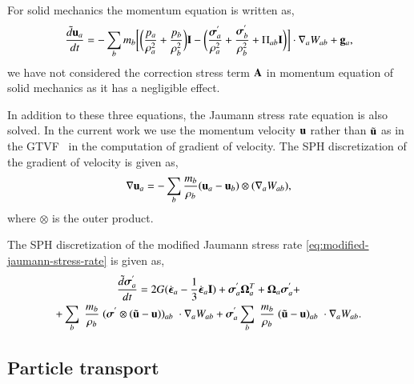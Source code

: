 %
For solid mechanics the momentum equation is written as,
\begin{equation}
  \label{eq:sph-momentum-solid}
  \frac{\tilde{d}\mathbf{u}_{a}}{dt} = - \sum_{b} m_b \bigg[
  \bigg(\frac{p_a}{\rho_a^2} + \frac{p_b}{\rho_b^2}\bigg) \mathbf{I} -
  \bigg(\frac{\boldsymbol{\sigma}^{'}_{a}}{\rho_a^2} +
  \frac{\boldsymbol{\sigma}^{'}_{b}}{\rho_b^2} + \Pi_{ab} \mathbf{I} \bigg) \bigg]  \cdot \nabla_{a} W_{ab} +
  \mathbf{g}_{a},
\end{equation}
we have not considered the correction stress term $\mathbf{A}$ in momentum
equation of solid mechanics as it has a negligible effect.

In addition to these three equations, the Jaumann stress rate equation is also
solved. In the current work we use the momentum velocity $\mathbf{u}$ rather than
$\tilde{\mathbf{u}}$ as in the GTVF~\citep{zhang_hu_adams17} in the computation of
gradient of velocity. The SPH discretization of the gradient of velocity is
given as,
\begin{equation}
  \label{eq:sph-vel-grad}
  \nabla \mathbf{u}_a =
  - \sum_{b} \frac{m_b}{\rho_{b}} (\mathbf{u}_{a} - \mathbf{u}_{b}) \otimes (\nabla_{a} W_{ab}),
\end{equation}
where $\otimes$ is the outer product.

The SPH discretization of the modified Jaumann stress rate
\cref{eq:modified-jaumann-stress-rate} is given as,
\begin{multline}
  \label{eq:sph-modified-jaumann-stress}
  \frac{\tilde{d}\boldsymbol{\sigma}^{'}_{a}}{dt} = 2G (\dot{\boldsymbol{\epsilon}}_{a} -
  \frac{1}{3} \dot{\boldsymbol{\epsilon}}_{a} \mathbf{I}) + \boldsymbol{\sigma}^{'}_{a}
  \boldsymbol{\Omega}_{a}^{T} +
  \boldsymbol{\Omega}_{a} \boldsymbol{\sigma}^{'}_{a} + \\
  + \sum_{b} \; \frac{m_b}{\rho_{b}} \; (\boldsymbol{\sigma}^{'} \otimes (\tilde{\mathbf{u}} -
  \mathbf{u}))_{ab} \; \cdot \nabla_{a} W_{ab}
  + \boldsymbol{\sigma}^{'}_{a} \sum_{b} \; \frac{m_b}{\rho_{b}} \;
  (\tilde{\mathbf{u}} - \mathbf{u})_{ab} \; \cdot \nabla_{a} W_{ab}.
\end{multline}



\subsection{Particle transport}

